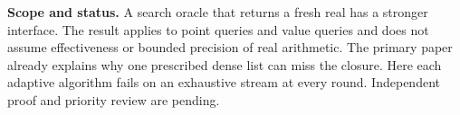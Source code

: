 \documentclass[11pt]{article}
\begin{document}
\textbf{Scope and status.} A search oracle that returns a fresh real has a stronger interface. The result applies to point queries and value queries and does not assume effectiveness or bounded precision of real arithmetic. The primary paper already explains why one prescribed dense list can miss the closure. Here each adaptive algorithm fails on an exhaustive stream at every round. Independent proof and priority review are pending.
\end{document}
